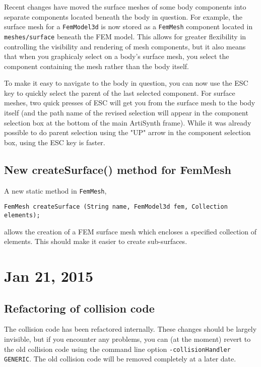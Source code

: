 \documentclass{article}
\begin{document}
Recent changes have moved the surface meshes of some body components
into separate components located beneath the body in question. For
example, the surface mesh for a {\tt FemModel3d} is now stored as a
{\tt FemMesh} component located in {\tt meshes/surface} beneath the
FEM model. This allows for greater flexibility in controlling the
visibility and rendering of mesh components, but it also means that
when you graphicaly select on a body's surface mesh, you select the
component containing the mesh rather than the body itself.

To make it easy to navigate to the body in question, you can now use
the ESC key to quickly select the parent of the last selected
component.  For surface meshes, two quick presses of ESC will get you
from the surface mesh to the body itself (and the path name of the
revised selection will appear in the component selection box at the
bottom of the main ArtiSynth frame). While it was already possible to
do parent selection using the "UP" arrow in the component selection
box, using the ESC key is faster.

\subsection*{New createSurface() method for FemMesh}

A new static method in {\tt FemMesh},
%
\begin{lstlisting}[]
   FemMesh createSurface (String name, FemModel3d fem, Collection elements);
\end{lstlisting}
%
allows the creation of a FEM surface mesh which encloses a specified
collection of elements. This should make it easier to create
sub-surfaces.

\section*{Jan 21, 2015}

\subsection*{Refactoring of collision code}

The collision code has been refactored internally.  These changes
should be largely invisible, but if you encounter any problems, you
can (at the moment) revert to the old collision code using the command
line option {\tt -collisionHandler GENERIC}. The old collision code
will be removed completely at a later date.
\end{document}
